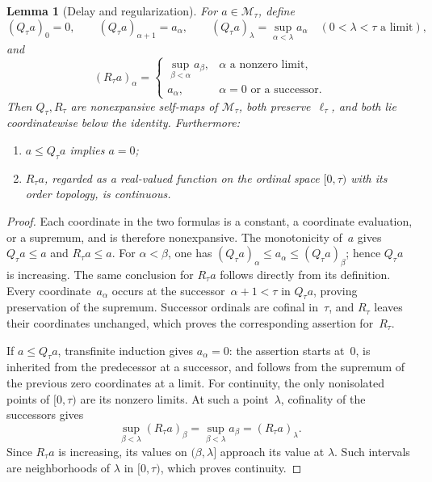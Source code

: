 \documentclass[preprint,12pt,nopreprintline]{elsarticle}
\newtheorem{lemma}[theorem]{Lemma}
\theoremstyle{definition}
\theoremstyle{remark}
\numberwithin{equation}{section}
\begin{document}
\begin{lemma}[Delay and regularization]
\label{tcp:lem:profile-operators}
For $a\in\mathcal M_\tau$, define
\begin{equation}
 (Q_\tau a)_0=0,\qquad
 (Q_\tau a)_{\alpha+1}=a_\alpha,\qquad
 (Q_\tau a)_\lambda=\sup_{\alpha<\lambda}a_\alpha
 \quad(0<\lambda<\tau\text{ a limit}),
 \label{tcp:eq:delay}
\end{equation}
and
\begin{equation}
 (R_\tau a)_\alpha=
 \begin{cases}
  \sup_{\beta<\alpha}a_\beta,
       &\alpha\text{ a nonzero limit},\\
  a_\alpha,&\alpha=0\text{ or a successor}.
 \end{cases}
 \label{tcp:eq:regularization}
\end{equation}
Then $Q_\tau,R_\tau$ are nonexpansive self-maps of $\mathcal M_\tau$, both preserve~$\ell_\tau$, and both lie
coordinatewise below the identity. Furthermore:
\begin{enumerate}
 \item $a\le Q_\tau a$ implies $a=0$;
 \item $R_\tau a$, regarded as a real-valued function on the ordinal space $[0,\tau)$ with its order topology, is continuous.
\end{enumerate}
\end{lemma}

\begin{proof}
Each coordinate in the two formulas is a constant, a coordinate evaluation, or a supremum, and is therefore nonexpansive. The
monotonicity of~$a$ gives $Q_\tau a\le a$ and $R_\tau a\le a$. For $\alpha<\beta$, one has $(Q_\tau a)_\alpha\le a_\alpha\le(Q_\tau a)_\beta$; hence $Q_\tau a$ is increasing. The same conclusion for $R_\tau a$ follows directly from its definition. Every coordinate~$a_\alpha$ occurs at the successor~$\alpha+1<\tau$ in $Q_\tau a$, proving preservation of the supremum. Successor ordinals are cofinal in~$\tau$, and $R_\tau$ leaves their coordinates unchanged, which proves the corresponding assertion for~$R_\tau$.

If $a\le Q_\tau a$, transfinite induction gives $a_\alpha=0$: the assertion starts at~$0$, is inherited from the predecessor at a
successor, and follows from the supremum of the previous zero coordinates at a limit. For continuity, the only nonisolated points
of $[0,\tau)$ are its nonzero limits. At such a point~$\lambda$, cofinality of the successors gives
\[
 \sup_{\beta<\lambda}(R_\tau a)_\beta
 =\sup_{\beta<\lambda}a_\beta=(R_\tau a)_\lambda.
\]
Since $R_\tau a$ is increasing, its values on $(\beta,\lambda]$ approach its value at $\lambda$. Such intervals are neighborhoods of $\lambda$ in $[0,\tau)$, which proves continuity.
\end{proof}
\end{document}
